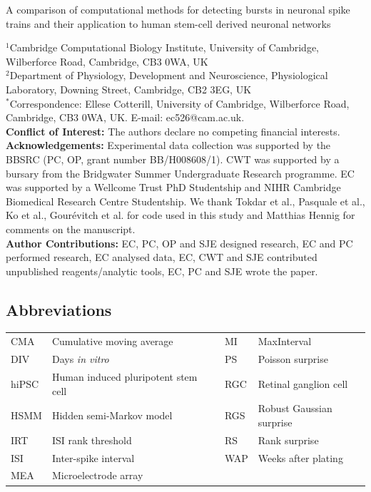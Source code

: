 \documentclass[12pt, titlepage]{article}
\begin{document}
	\begin{titlepage}
		\begin{center}
		
	
			{\LARGE   A comparison of computational methods for detecting bursts in neuronal spike trains and their application to human stem-cell derived neuronal networks}
			\\ 
			\end{center}
		\noindent$^1$Cambridge Computational Biology Institute, University of Cambridge, Wilberforce Road, Cambridge, CB3 0WA, UK
		\\$^2$Department of Physiology, Development and Neuroscience, Physiological Laboratory, Downing Street, Cambridge, CB2 3EG, UK
		\\$^*$Correspondence: Ellese Cotterill, University of Cambridge, Wilberforce Road, Cambridge,
		CB3 0WA, UK. E-mail: ec526@cam.ac.uk.
		 \bigskip \\ \textbf{Conflict of Interest:} The authors declare no competing financial interests.
		  \bigskip \\ \textbf{Acknowledgements:} Experimental data collection was supported by the BBSRC (PC, OP, grant number BB/H008608/1). CWT was supported by a bursary from the Bridgwater Summer Undergraduate Research programme. EC was supported by a Wellcome Trust PhD Studentship and NIHR Cambridge Biomedical Research Centre Studentship. We thank Tokdar et al., Pasquale et al., Ko et al., Gour\'{e}vitch et al. for code used in this study and Matthias Hennig for comments on the manuscript. 
		 \bigskip \\ \textbf{Author Contributions:} EC, PC, OP and SJE designed research, EC and PC performed research, EC analysed data, EC, CWT and SJE contributed unpublished reagents/analytic tools, EC, PC and SJE wrote the paper.
	\end{titlepage}
	 \subsection*{Abbreviations}
	 \begin{tabular}{llll}
	 	\hline
	 	CMA & Cumulative moving average & MI & MaxInterval
	 	\\DIV &  Days \textit{in vitro} & PS &  Poisson surprise
	 	\\hiPSC & Human induced pluripotent stem cell \ \ \ &  RGC & Retinal ganglion cell
	 	\\HSMM &  Hidden semi-Markov model & RGS & Robust Gaussian surprise
	 	\\IRT & ISI rank threshold &	RS & Rank surprise
	 	\\ISI &  Inter-spike interval & WAP & Weeks after plating
	 	\\MEA & Microelectrode array & 
	 	\\ \hline
	 \end{tabular}
\end{document}
